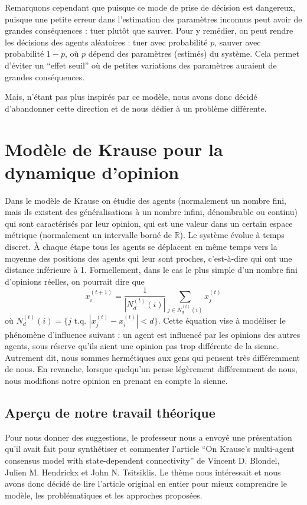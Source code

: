 \documentclass[a4paper,10pt]{article}
\begin{document}
Remarquons cependant que puisque ce mode de prise de décision est dangereux, puisque une petite erreur dans l'estimation des paramètres inconnus peut avoir de grandes conséquences : tuer plutôt que sauver. Pour y remédier, on peut rendre les décisions des agents aléatoires : tuer avec probabilité $p$, sauver avec probabilité $1-p$, où $p$ dépend des paramètres (estimés) du système. Cela permet d'éviter un ``effet seuil'' où de petites variations des paramètres auraient de grandes conséquences.

Mais, n'étant pas plus inspirés par ce modèle, nous avons donc décidé d'abandonner cette direction et de nous dédier à un problème différente.

\section{Modèle de Krause pour la dynamique d'opinion}

Dans le modèle de Krause on étudie des agents (normalement un nombre fini, mais ils existent des généralisations à un nombre infini, dénombrable ou continu) qui sont caractérisés par leur opinion, qui est une valeur dans un certain espace métrique (normalement un intervalle borné de $\mathbb{R}$). Le système évolue à temps discret. À chaque étape tous les agents se déplacent en même temps vers la moyenne des positions des agents qui leur sont proches, c'est-à-dire qui ont une distance inférieure à 1. Formellement, dans le cas le plus simple d'un nombre fini d'opinions réelles, on pourrait dire que
\begin{equation}
x_i^{(t+1)} = \frac{1}{|N_d^{(t)}(i)|} \sum_{j \in N_d^{(t)}(i)} x_j^{(t)}
\end{equation}
où $N_d^{(t)}(i) = \{j \text{ t.q. } |x_j^{(t)} - x_i^{(t)}| < d\}$.
Cette équation vise à modéliser le phénomène d'influence suivant : un agent est influencé par les opinions des autres agents, sous réserve qu'ils aient une opinion pas trop différente de la sienne. Autrement dit, nous sommes hermétiques aux gens qui pensent très différemment de nous. En revanche, lorsque quelqu'un pense légèrement différemment de nous, nous modifions notre opinion en prenant en compte la sienne.

\subsection{Aperçu de notre travail théorique}

Pour nous donner des suggestions, le professeur nous a envoyé une présentation qu'il avait fait pour synthétiser et commenter l'article ``On Krause’s multi-agent consensus model with state-dependent connectivity'' de Vincent D. Blondel, Julien M. Hendrickx et John N. Tsitsiklis. Le thème nous intéressait et nous avons donc décidé de lire l'article original en entier pour mieux comprendre le modèle, les problématiques et les approches proposées.
\end{document}
